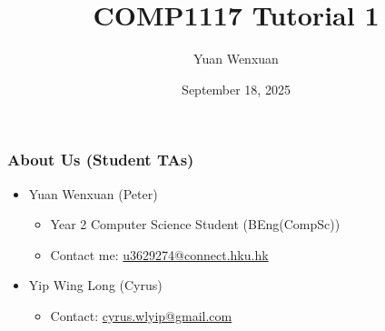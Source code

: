 \documentclass{beamer}
\title{COMP1117 Tutorial 1}
\author{Yuan Wenxuan}
\date{September 18, 2025}
\begin{document}
\frame{\titlepage}

\begin{frame}
    \frametitle{About Us (Student TAs)}

    \begin{itemize}
        \item Yuan Wenxuan (Peter)
              \begin{itemize}
                  \item Year 2 Computer Science Student (BEng(CompSc))
                  \item Contact me: \href{mailto:u3629274@connect.hku.hk}{u3629274@connect.hku.hk}
              \end{itemize}
        \item Yip Wing Long (Cyrus)
              \begin{itemize}
                  \item Contact: \href{mailto:cyrus.wlyip@gmail.com}{cyrus.wlyip@gmail.com}
              \end{itemize}
    \end{itemize}
\end{frame}
\end{document}
